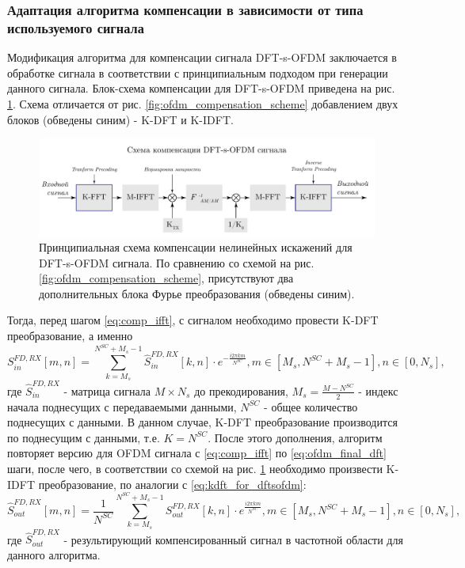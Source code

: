 \subsubsection{Адаптация алгоритма компенсации в зависимости от типа используемого сигнала}
\label{sec:apadt}
Модификация алгоритма для компенсации сигнала DFT-s-OFDM заключается в
обработке сигнала в соответствии с принципиальным подходом при генерации
данного сигнала. Блок-схема компенсации для DFT-s-OFDM приведена на рис.
\ref{fig:dfts_compensation_scheme}. Схема отличается от рис.
\ref{fig:ofdm_compensation_scheme} добавлением двух блоков (обведены синим)
- K-DFT и K-IDFT.

\begin{figure}[h!]
    \centering
    \includegraphics[width=0.99\linewidth]{figs/dfts_compensation_scheme.pdf}
    \caption{Принципиальная схема компенсации нелинейных искажений для
    DFT-s-OFDM сигнала. По сравнению со схемой на рис.
    \ref{fig:ofdm_compensation_scheme}, присутствуют два дополнительных
    блока Фурье преобразования (обведены синим).}
    \label{fig:dfts_compensation_scheme}
\end{figure}

Тогда, перед шагом \ref{eq:comp_ifft}, с сигналом необходимо провести K-DFT
преобразование, а именно
\begin{equation}
    S^{FD, RX}_{in}[m, n] = \sum^{N^{SC}+M_s-1}_{k=M_s} \hat{S}^{FD, RX}_{in}[k, n]
    \cdot e^{-\frac{i 2 \pi k m}{N^{SC}}}, m \in [M_s, N^{SC}+M_s-1], n \in [0, N_s],
    \label{eq:kdft_for_dftsofdm}
\end{equation}
где $\hat{S}^{FD, RX}_{in}$ - матрица сигнала $M\times N_s$ до
прекодирования, $M_s = \frac{M-N^{SC}}{2}$ - индекс начала поднесущих с
передаваемыми данными, $N^{SC}$ - общее количество поднесущих с данными.
В данном случае, K-DFT преобразование производится по поднесущим с данными,
т.е. $K = N^{SC}$. После этого дополнения, алгоритм повторяет
версию для OFDM сигнала с \ref{eq:comp_ifft} по \ref{eq:ofdm_final_dft} шаги,
после чего, в соответствии со схемой на рис.
\ref{fig:dfts_compensation_scheme} необходимо произвести K-IDFT
преобразование, по аналогии с \ref{eq:kdft_for_dftsofdm}:
\begin{equation}
    \hat{S}^{FD, RX}_{out}[m, n] = \frac{1}{N^{SC}}\sum^{N^{SC}+M_s-1}_{k=M_s} S^{FD, RX}_{out}[k, n]
    \cdot e^{\frac{i 2 \pi k m}{N^{SC}}}, m \in [M_s, N^{SC}+M_s-1], n \in [0, N_s],
    \label{eq:kidft_for_dftsofdm}
\end{equation}
где $\hat{S}^{FD, RX}_{out}$ - результирующий компенсированный сигнал в
частотной области для данного алгоритма.

